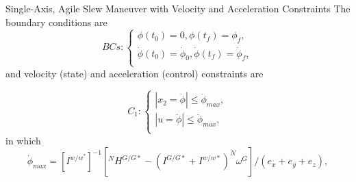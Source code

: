 \documentclass{beamer}
\begin{document}
\begin{frame}
\begin{block}{ Single-Axis, Agile Slew Maneuver with Velocity and Acceleration Constraints}
The boundary conditions are
\begin{equation}\label{Bcs}
 BCs:\left\{
                \begin{array}{l}
                \phi(t_0)=0, \phi(t_f)=\phi_{f},\\
               \dot{\phi}(t_0)=\dot{\phi}_{0},\dot{ \phi}(t_f)=\dot{\phi}_{f}, \\
                \end{array}
              \right.
 \end{equation}
and velocity (state) and acceleration (control) constraints are

\begin{equation}\label{constraints1}
 C_1:\left\{
                \begin{array}{l}
               |x_2=\dot{\phi}|\leq \dot{\phi}_{max},\\
              |u=\ddot{\phi}|\leq \ddot{\phi}_{max},\\
                \end{array}
              \right.
 \end{equation}
in which
\begin{equation}
\dot{\phi}_{max}=[I^{w/w^*}]^{-1}[^NH^{G/G*}-(I^{G/G*}+I^{w/w*})^N\omega^G]/(e_x+e_y+e_z),
\end{equation}


\end{block}
\end{frame}
\end{document}
